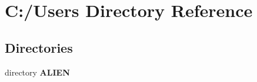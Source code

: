 \section{C\+:/\+Users Directory Reference}
\label{dir_d522931ffa1371640980b621734a4381}
\subsection*{Directories}
\begin{DoxyCompactItemize}
\item 
directory {\bf A\+L\+I\+EN}
\end{DoxyCompactItemize}
